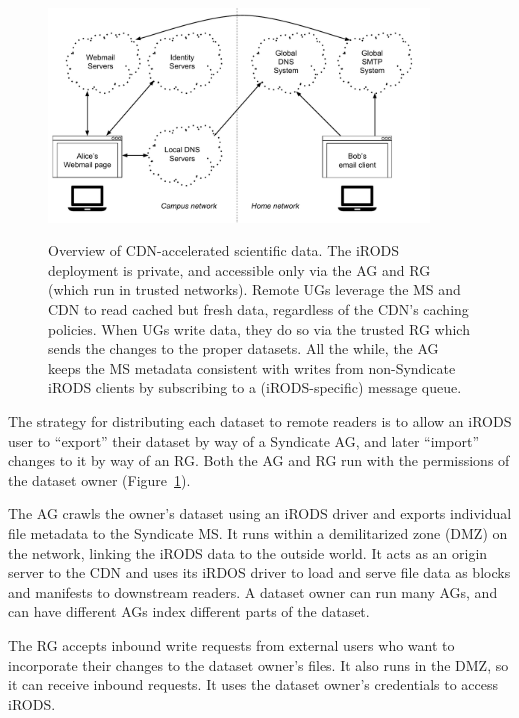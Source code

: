 \begin{figure}[h]
   \caption{Overview of CDN-accelerated scientific data.  The iRODS deployment
   is private, and accessible only via the AG and RG (which run in trusted
   networks).  Remote UGs leverage the MS and CDN to read cached but fresh data,
   regardless of the CDN's caching policies.  When UGs write data, they do so
   via the trusted RG which sends the changes to the proper datasets.  All the
   while, the AG keeps the MS metadata consistent with writes from non-Syndicate
   iRODS clients by subscribing to a (iRODS-specific) message queue.}
   \centering
   \includegraphics[width=0.9\textwidth,page=25]{figures/dissertation-figures}
   \label{fig:chap4-syndicate-datasets}
\end{figure}

The strategy for distributing each dataset to remote readers is to allow an
iRODS user to ``export'' their dataset by way of a Syndicate AG, and later
``import'' changes to it by way of an RG.  Both the AG and RG run with the
permissions of the dataset owner (Figure~\ref{fig:chap4-syndicate-datasets}).

The AG crawls the owner's dataset using
an iRODS driver and exports individual file metadata to the Syndicate MS.
It runs within a demilitarized zone (DMZ) on the network, linking the iRODS data
to the outside world.  It acts as an origin
server to the CDN and uses its iRDOS driver to load and serve file data as blocks and
manifests to downstream readers.  A dataset owner can run many AGs, and can have
different AGs index different parts of the dataset.

The RG accepts inbound write requests from external users who want to
incorporate their changes to the dataset owner's files.  It also runs in the
DMZ, so it can receive inbound requests.  It uses the dataset owner's
credentials to access iRODS.

